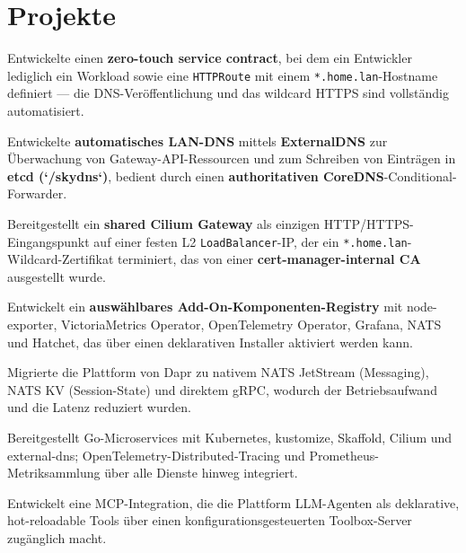 \documentclass[10pt,a4paper]{resume}
\begin{document}
\vspace{2pt}

\section{Projekte}

\bullets
  \item Entwickelte einen \textbf{zero-touch service contract}, bei dem ein Entwickler lediglich ein Workload sowie eine \texttt{HTTPRoute} mit einem \texttt{*.home.lan}-Hostname definiert — die DNS-Veröffentlichung und das wildcard HTTPS sind vollständig automatisiert.
  \item Entwickelte \textbf{automatisches LAN-DNS} mittels \textbf{ExternalDNS} zur Überwachung von Gateway-API-Ressourcen und zum Schreiben von Einträgen in \textbf{etcd (`/skydns`)}, bedient durch einen \textbf{authoritativen CoreDNS}-Conditional-Forwarder.
  \item Bereitgestellt ein \textbf{shared Cilium Gateway} als einzigen HTTP/HTTPS-Eingangspunkt auf einer festen L2 \texttt{LoadBalancer}-IP, der ein \texttt{*.home.lan}-Wildcard-Zertifikat terminiert, das von einer \textbf{cert-manager-internal CA} ausgestellt wurde.
  \item Entwickelt ein \textbf{auswählbares Add-On-Komponenten-Registry} mit node-exporter, VictoriaMetrics Operator, OpenTelemetry Operator, Grafana, NATS und Hatchet, das über einen deklarativen Installer aktiviert werden kann.
\bulletsend
\vspace{1.0pt}
\bullets
  \item Migrierte die Plattform von Dapr zu nativem NATS JetStream (Messaging), NATS KV (Session-State) und direktem gRPC, wodurch der Betriebsaufwand und die Latenz reduziert wurden.
  \item Bereitgestellt Go-Microservices mit Kubernetes, kustomize, Skaffold, Cilium und external-dns; OpenTelemetry-Distributed-Tracing und Prometheus-Metriksammlung über alle Dienste hinweg integriert.
  \item Entwickelt eine MCP-Integration, die die Plattform LLM-Agenten als deklarative, hot-reloadable Tools über einen konfigurationsgesteuerten Toolbox-Server zugänglich macht.
\bulletsend
\end{document}
